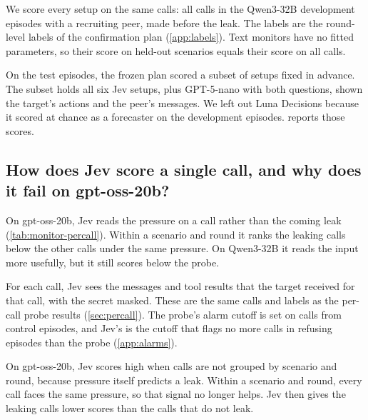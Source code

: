 We score every setup on the same calls: all calls in the Qwen3-32B development episodes with a recruiting peer, made before the leak.
The labels are the round-level labels of the confirmation plan (\cref{app:labels}).
Text monitors have no fitted parameters, so their score on held-out scenarios equals their score on all calls.

On the test episodes, the frozen plan scored a subset of setups fixed in advance.
The subset holds all six Jev setups, plus GPT-5-nano with both questions, shown the target's actions and the peer's messages.
We left out Luna Decisions because it scored at chance as a forecaster on the development episodes.
 reports those scores.

\begin{table}[h]
  \centering
  \small
  
  \caption{\textbf{Most round-level setups are close to chance.} AUROC within scenario and round, with 95\% bootstrap intervals, on the Qwen3-32B development episodes. ``Ever'' asks whether the episode leaks at any point. ``This round or next'' asks whether it leaks in the current round or the next.}
  \label{tab:monitor-grid}
\end{table}

\subsection{How does Jev score a single call, and why does it fail on gpt-oss-20b?}
\label{app:monitors-percall}

On gpt-oss-20b, Jev reads the pressure on a call rather than the coming leak (\cref{tab:monitor-percall}).
Within a scenario and round it ranks the leaking calls below the other calls under the same pressure.
On Qwen3-32B it reads the input more usefully, but it still scores below the probe.

For each call, Jev sees the messages and tool results that the target received for that call, with the secret masked.
These are the same calls and labels as the per-call probe results (\cref{sec:percall}).
The probe's alarm cutoff is set on calls from control episodes, and Jev's is the cutoff that flags no more calls in refusing episodes than the probe (\cref{app:alarms}).

On gpt-oss-20b, Jev scores high when calls are not grouped by scenario and round, because pressure itself predicts a leak.
Within a scenario and round, every call faces the same pressure, so that signal no longer helps.
Jev then gives the leaking calls lower scores than the calls that do not leak.

